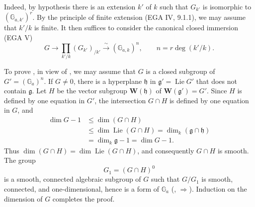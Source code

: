 
Indeed, by hypothesis there is an extension \(k'\) of \(k\) such
that \(G_{k'}\) is isomorphic to \((\mathbb G_{a,k'})^r\).  By the
principle of finite extension (EGA IV, 9.1.1), we may assume that
\(k'/k\) is finite.  It then suffices to consider the
canonical closed immersion (EGA V)
\[
  G\longrightarrow
  \prod_{k'/k}(G_{k'})_{/k'}
  \xrightarrow{\ \sim\ }(\mathbb G_{a,k})^n,
  \qquad n=r\deg(k'/k).
\]

To prove , in view of , we may assume that \(G\) is a closed
subgroup of \(G'=(\mathbb G_a)^n\).  If \(G\ne0\), there is a
hyperplane \(\mathfrak h\) in
\(\mathfrak g'=\operatorname{Lie}G'\) that does not contain
\(\mathfrak g\).  Let \(H\) be the vector subgroup
\(\mathbf W(\mathfrak h)\) of
\(\mathbf W(\mathfrak g')=G'\).  Since \(H\) is defined by one
equation in \(G'\), the intersection \(G\cap H\) is defined by one
equation in \(G\), and
\[
\begin{aligned}
  \dim G-1
  &\leq \dim(G\cap H)\\
  &\leq \dim\operatorname{Lie}(G\cap H)
   =\dim_k(\mathfrak g\cap\mathfrak h)\\
  &=\dim_k\mathfrak g-1
   =\dim G-1.
\end{aligned}
\]
Thus
\(\dim(G\cap H)=\dim\operatorname{Lie}(G\cap H)\), and consequently
\(G\cap H\) is smooth.  The group
\[
  G_1=(G\cap H)^0
\]
is a smooth, connected algebraic subgroup of \(G\) such that
\(G/G_1\) is smooth, connected, and one-dimensional, hence is a
form of \(\mathbb G_a\) (, \(\Rightarrow\)).  Induction
on the dimension of \(G\) completes the proof.
